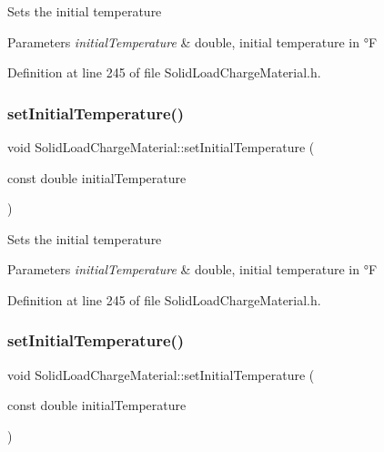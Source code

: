 Sets the initial temperature 
\begin{DoxyParams}{Parameters}
{\em initial\+Temperature} & double, initial temperature in °F \\
\hline
\end{DoxyParams}


Definition at line 245 of file Solid\+Load\+Charge\+Material.\+h.

\mbox{\label{class_solid_load_charge_material_ac80e565d26e68e542f4cb41f41b7d96c}} 
\subsubsection{\texorpdfstring{set\+Initial\+Temperature()}{setInitialTemperature()}\hspace{0.1cm}{\footnotesize\ttfamily [2/3]}}
{\footnotesize\ttfamily void Solid\+Load\+Charge\+Material\+::set\+Initial\+Temperature (\begin{DoxyParamCaption}\item[{const double}]{initial\+Temperature }\end{DoxyParamCaption})\hspace{0.3cm}{\ttfamily [inline]}}

Sets the initial temperature 
\begin{DoxyParams}{Parameters}
{\em initial\+Temperature} & double, initial temperature in °F \\
\hline
\end{DoxyParams}


Definition at line 245 of file Solid\+Load\+Charge\+Material.\+h.

\mbox{\label{class_solid_load_charge_material_ac80e565d26e68e542f4cb41f41b7d96c}} 
\subsubsection{\texorpdfstring{set\+Initial\+Temperature()}{setInitialTemperature()}\hspace{0.1cm}{\footnotesize\ttfamily [3/3]}}
{\footnotesize\ttfamily void Solid\+Load\+Charge\+Material\+::set\+Initial\+Temperature (\begin{DoxyParamCaption}\item[{const double}]{initial\+Temperature }\end{DoxyParamCaption})\hspace{0.3cm}{\ttfamily [inline]}}

